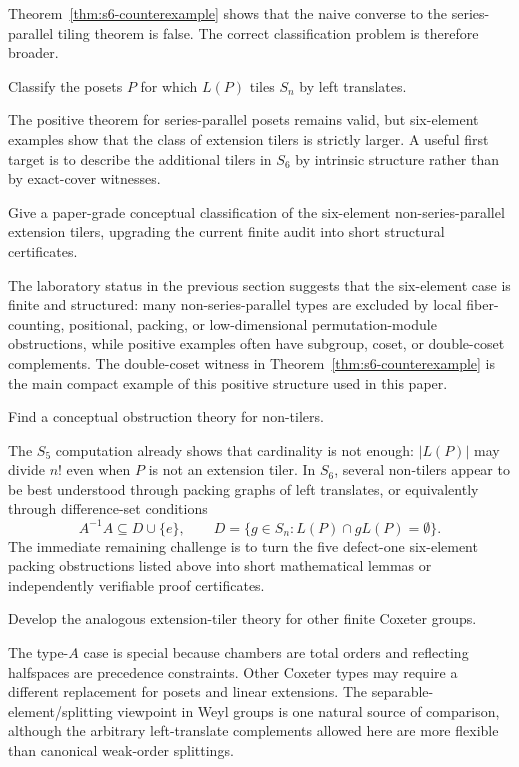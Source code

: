 Theorem~\ref{thm:s6-counterexample} shows that the naive converse to the
series-parallel tiling theorem is false.  The correct classification
problem is therefore broader.

\begin{problem}
Classify the posets $P$ for which $L(P)$ tiles $S_n$ by left translates.
\end{problem}

The positive theorem for series-parallel posets remains valid, but
six-element examples show that the class of extension tilers is strictly
larger.  A useful first target is to describe the additional tilers in
$S_6$ by intrinsic structure rather than by exact-cover witnesses.

\begin{problem}
Give a paper-grade conceptual classification of the six-element
non-series-parallel extension tilers, upgrading the current finite audit
into short structural certificates.
\end{problem}

The laboratory status in the previous section suggests that the
six-element case is finite and structured: many non-series-parallel types
are excluded by local fiber-counting, positional, packing, or
low-dimensional permutation-module obstructions, while positive examples
often have subgroup, coset, or double-coset complements.  The double-coset
witness in Theorem~\ref{thm:s6-counterexample} is the main compact example
of this positive structure used in this paper.

\begin{problem}
Find a conceptual obstruction theory for non-tilers.
\end{problem}

The $S_5$ computation already shows that cardinality is not enough:
$|L(P)|$ may divide $n!$ even when $P$ is not an extension tiler.  In
$S_6$, several non-tilers appear to be best understood through packing
graphs of left translates, or equivalently through difference-set
conditions
\[
        A^{-1}A\subseteq D\cup\{e\},
        \qquad
        D=\{g\in S_n:L(P)\cap gL(P)=\emptyset\}.
\]
The immediate remaining challenge is to turn the five defect-one
six-element packing obstructions listed above into short mathematical
lemmas or independently verifiable proof certificates.

\begin{problem}
Develop the analogous extension-tiler theory for other finite Coxeter
groups.
\end{problem}

The type-$A$ case is special because chambers are total orders and
reflecting halfspaces are precedence constraints.  Other Coxeter types may
require a different replacement for posets and linear extensions.
The separable-element/splitting viewpoint in Weyl groups
\cite{GaetzGao2020} is one natural source of comparison, although the
arbitrary left-translate complements allowed here are more flexible than
canonical weak-order splittings.
